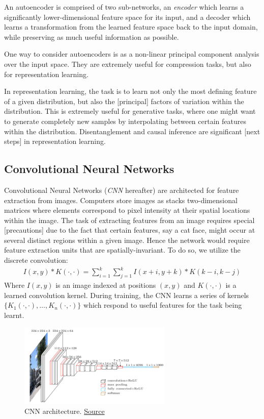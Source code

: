 \documentclass[paper=a4, fontsize=12pt]{scrartcl} %
\numberwithin{equation}{section} %
\numberwithin{figure}{section} %
\numberwithin{table}{section} %
\begin{document}
An autoencoder is comprised of two sub-networks, an \textit{encoder} which learns a significantly lower-dimensional feature space for its input, and a decoder 
which learns a transformation from the learned feature space back to the input domain, while preserving as much useful information as possible.

One way to consider autoencoders is as a non-linear principal component analysis over the input space. They are extremely useful for compression tasks, but also for 
representation learning.

In representation learning, the task is to learn not only the most defining feature of a given distribution, but also the [principal] factors of 
variation within the distribution. This is extremely useful for generative tasks, where one might want to generate completely new samples by interpolating 
between certain features within the distribution. Disentanglement and causal inference are significant [next steps] in representation learning.

\pagebreak

\subsection{Convolutional Neural Networks}

Convolutional Neural Networks (\textit{CNN} hereafter) are architected for feature extraction from images. Computers store images as stacks
two-dimensional matrices where elements correspond to pixel intensity at their spatial locations within the image. The task of extracting features from 
an image requires special [precautions] due to the fact that certain features, say a cat face, might occur at several distinct regions within 
a given image. Hence the network would require feature extraction units that are spatially-invariant. To do so, we utilize the 
discrete convolution:
\begin{align*}
    I(x, y) * K(\cdot, \cdot) = \sum_{i = 1}^k \sum_{j = 1}^k I(x + i, y + k) * K(k - i, k - j)
\end{align*}
Where $I(x, y)$ is an image indexed at positions $(x, y)$ and $K(\cdot, \cdot)$ is a learned convolution kernel. During training, the CNN learns a series of 
kernels $\{ K_1(\cdot, \cdot), \ldots, K_n(\cdot, \cdot) \}$ which respond to useful features for the task being learnt.

\begin{figure}[H]
    \centering
    \includegraphics[width=0.65\textwidth]{images/cnn}
    \caption{CNN architecture. \href{https://medium.com/@purnasaigudikandula/a-beginner-intro-to-convolutional-neural-networks-684c5620c2ce}{Source}}
\end{figure}
\end{document}
